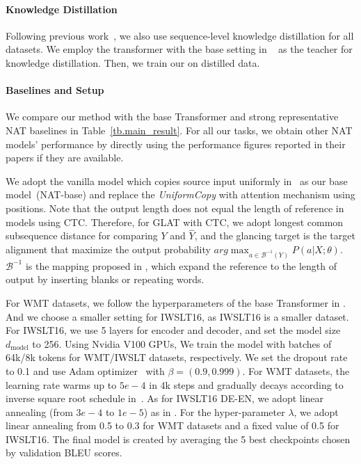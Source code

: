 \paragraph{Knowledge Distillation}
Following previous work~\citep{nat,iter_nat,nat_reg}, we also use sequence-level knowledge distillation for all datasets. 
We employ the transformer with the base setting in ~\citet{transformer} as the teacher for knowledge distillation. Then, we train our \method on distilled data.

\paragraph{Baselines and Setup}
We compare our method with the base Transformer and strong representative NAT baselines in Table~\ref{tb.main_result}.
For all our tasks, we obtain other NAT models' performance by directly using the performance figures reported in their papers if they are available.

We adopt the vanilla model which copies source input uniformly in~\citet{nat} as our base model~(NAT-base) and replace the \textit{UniformCopy} with attention mechanism using positions. 
Note that the output length does not equal the length of reference in models using CTC. Therefore, for GLAT with CTC, we adopt longest common subsequence distance for comparing $Y$ and $\hat{Y}$, and the glancing target is the target alignment that maximize the output probability $arg\max_{a\in \mathcal{B}^{-1} (Y)} P(a|X;\theta)$. $\mathcal{B}^{-1}$ is the mapping proposed in \citep{ctc}, which expand the reference to the length of output by inserting blanks or repeating words.

For WMT datasets, we follow the hyperparameters of the base Transformer in \citet{transformer}. And we choose a smaller setting for IWSLT16, as IWSLT16 is a smaller dataset. For IWSLT16, we use 5 layers for encoder and decoder, and set the model size $d_{\text{model}}$ to 256.
Using Nvidia V100 GPUs, We train the model with batches of 64k/8k tokens for WMT/IWSLT datasets, respectively. We set the dropout rate to 0.1 and use Adam optimizer~\citep{adam} with $\beta=(0.9,0.999)$.
For WMT datasets, the learning rate warms up to $5e-4$ in 4k steps and gradually decays according to inverse square root schedule in~\citet{transformer}. As for IWSLT16 DE-EN, we adopt linear annealing (from $3e-4$ to $1e-5$) as in \citet{iter_nat}. For the hyper-parameter $\lambda$, we adopt linear annealing from 0.5 to 0.3 for WMT datasets and a fixed value of 0.5 for IWSLT16.
The final model is created by averaging the 5 best checkpoints chosen by validation BLEU scores.

